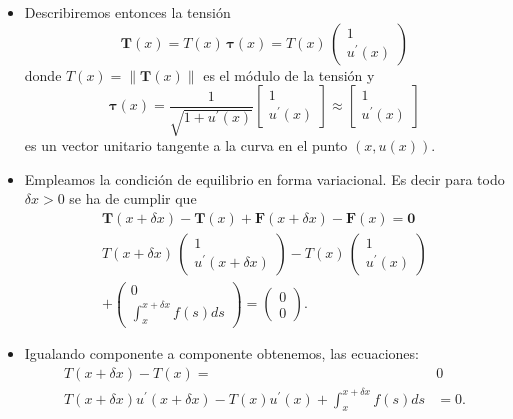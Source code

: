 \documentclass[10pt,handout]{beamer}
\theoremstyle{plain} %
\theoremstyle{plain} %
\theoremstyle{plain} %
\theoremstyle{plain} %
\theoremstyle{definition}
\theoremstyle{example}
\theoremstyle{example}
\theoremstyle{remark}
\theoremstyle{remark}
\begin{document}
\begin{frame}
\begin{itemize}
\item Describiremos entonces la tensión 
$$
\mathbf{T}(x) = T(x) \, \boldsymbol{\tau}(x) = T(x)\,\left(
\begin{array}{c}
1 \\ 
u^{\prime}(x)
\end{array}
\right)
$$
donde $T(x) = \|\mathbf{T}(x)\|$ es el módulo de la tensión y 
$$
\boldsymbol{\tau}(x) =
\frac{1}{\sqrt{1+u^{\prime}(x)}}
\begin{bmatrix}
1 \\ 
u^{\prime}(x)
\end{bmatrix} \approx \begin{bmatrix}
    1 \\ 
    u^{\prime}(x)
    \end{bmatrix} 
$$ es un vector unitario tangente a la curva en el punto $(x,u(x)).$
\end{itemize}
\end{frame}

\begin{frame}
\begin{itemize}
\item Empleamos la condición de equilibrio en forma variacional. Es decir para todo $\delta x > 0$ se ha de cumplir que 
\begin{align*}
\mathbf{T}(x+\delta x) -\mathbf{T}(x) + \mathbf{F}(x+\delta x) - \mathbf{F}(x) = \mathbf{0} \\
T(x+\delta x)\,\left(
\begin{array}{c}
1 \\ 
u^{\prime}(x+\delta x)
\end{array}
\right) - T(x)\,\left(
\begin{array}{c}
1 \\ 
u^{\prime}(x)
\end{array}
\right) \\ + \left( \begin{array}{c} 0 \\  \int_x^{x+\delta x} f(s)ds  \end{array}\right) = \left(
\begin{array}{c}
0 \\ 
0
\end{array}
\right).
\end{align*}
\item Igualando componente a componente obtenemos, las ecuaciones:
\begin{align*}
T(x+\delta x) - T(x)  = & 0 \\ 
T(x+\delta x) u^{\prime}(x+\delta x) - T(x) u^{\prime}(x) +  \int_x^{x+\delta x} f(s)ds & = 0. 
\end{align*}
\end{itemize}
\end{frame}
\end{document}
